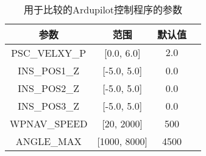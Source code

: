 \begin{table}[ht]
\caption{用于比较的Ardupilot控制程序的参数}
\label{tab:range_cmp_param}
\centering
\begin{tabular}{cccp{}}
        \toprule[1.5pt]
         参数 & 范围 & 默认值 \\
        \midrule[0.8pt]
          PSC\_VELXY\_P & [0.0, 6.0] & $2.0$\\
  
         INS\_POS1\_Z & [-5.0, 5.0] & 0.0\\
        
         INS\_POS2\_Z & [-5.0, 5.0] & 0.0 \\
        
         INS\_POS3\_Z & [-5.0, 5.0] &0.0\\

         WPNAV\_SPEED & [20, 2000] & 500 \\
        
       
         ANGLE\_MAX & [1000, 8000] & 4500\\
        \bottomrule[1.5pt]
\end{tabular}
\end{table}